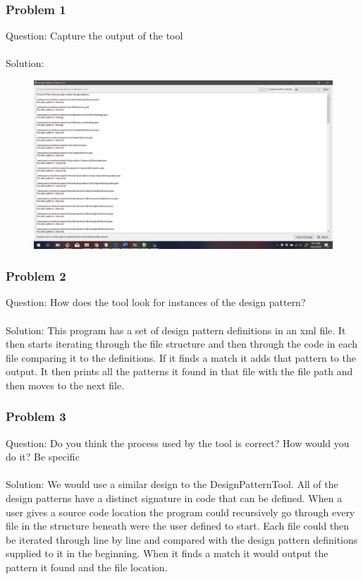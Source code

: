 \documentclass{article}
\begin{document}
\subsubsection*{Problem 1}
Question: Capture the output of the tool\\\\
Solution: 
\begin{figure}[h]
	\centering
	\includegraphics[width=6in]{hw4-patterns.png}
\end{figure}

\subsubsection*{Problem 2}
Question: How does the tool look for instances of the design pattern?\\\\
Solution: This program has a set of design pattern definitions in an xml file. It then starts iterating through the file structure and then through the code in each file comparing it to the definitions. If it finds a match it adds that pattern to the output. It then prints all the patterns it found in that file with the file path and then moves to the next file. 

\subsubsection*{Problem 3}
Question: Do you think the process used by the tool is correct?  How would you do it? Be specific\\\\
Solution: We would use a similar design to the DesignPatternTool. All of the design patterns have a distinct signature in code that can be defined. When a user gives a source code location the program could recursively go through every file in the structure beneath were the user defined to start. Each file could then be iterated through line by line and compared with the design pattern definitions supplied to it in the beginning. When it finds a match it would output the pattern it found and the file location. 
\end{document}

